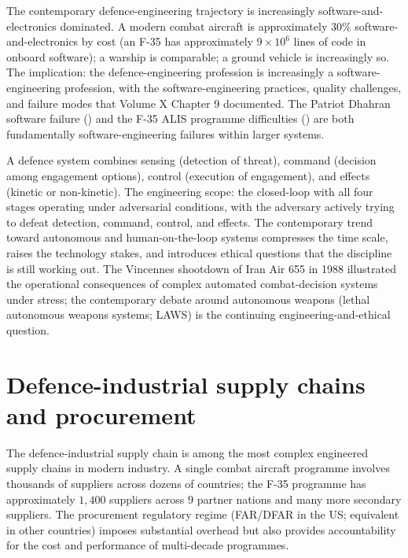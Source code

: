The contemporary defence-engineering trajectory is increasingly software-and-electronics dominated. A modern combat aircraft is approximately $30\%$ software-and-electronics by cost (an F-35 has approximately $9 \times 10^6$ lines of code in onboard software); a warship is comparable; a ground vehicle is increasingly so. The implication: the defence-engineering profession is increasingly a software-engineering profession, with the software-engineering practices, quality challenges, and failure modes that Volume X Chapter 9 documented. The Patriot Dhahran software failure (\cite{acc:gao-patriot-1992}) and the F-35 ALIS programme difficulties (\cite{acc:gao-f35-alis-2020}) are both fundamentally software-engineering failures within larger systems.

\begin{archetype}
A defence system combines sensing (detection of threat), command (decision among engagement options), control (execution of engagement), and effects (kinetic or non-kinetic). The engineering scope: the closed-loop with all four stages operating under adversarial conditions, with the adversary actively trying to defeat detection, command, control, and effects. The contemporary trend toward autonomous and human-on-the-loop systems compresses the time scale, raises the technology stakes, and introduces ethical questions that the discipline is still working out. The Vincennes shootdown of Iran Air 655 in 1988 illustrated the operational consequences of complex automated combat-decision systems under stress; the contemporary debate around autonomous weapons (lethal autonomous weapons systems; LAWS) is the continuing engineering-and-ethical question.
\end{archetype}

\section{Defence-industrial supply chains and procurement}

The defence-industrial supply chain is among the most complex engineered supply chains in modern industry. A single combat aircraft programme involves thousands of suppliers across dozens of countries; the F-35 programme has approximately $1{,}400$ suppliers across $9$ partner nations and many more secondary suppliers. The procurement regulatory regime (FAR/DFAR in the US; equivalent in other countries) imposes substantial overhead but also provides accountability for the cost and performance of multi-decade programmes.

